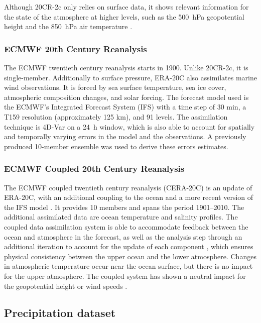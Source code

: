 \documentclass[smallextended]{svjour3}       %
\begin{document}
	Although 20CR-2c only relies on surface data, it shows relevant information for the state of the atmosphere at higher levels, such as the 500~hPa geopotential height and the 850~hPa air temperature \citep{Compo2011}.
	
	
	\subsubsection{ECMWF 20th Century Reanalysis}
	
	The ECMWF twentieth century reanalysis \citep[ERA-20C --][]{Poli2016} starts in 1900. Unlike 20CR-2c, it is single-member. Additionally to surface pressure, ERA-20C also assimilates marine wind observations. It is forced by sea surface temperature, sea ice cover, atmospheric composition changes, and solar forcing. The forecast model used is the ECMWF’s Integrated Forecast System (IFS) with a time step of 30 min, a T159 resolution (approximately 125 km), and 91 levels. The assimilation technique is 4D-Var on a 24~h window, which is also able to account for spatially and temporally varying errors in the model and the observations. A previously produced 10-member ensemble was used to derive these errors estimates.
	
	
	\subsubsection{ECMWF Coupled 20th Century Reanalysis}
	
	The ECMWF coupled twentieth century reanalysis (CERA-20C) is an update of ERA-20C, with an additional coupling to the ocean and a more recent version of the IFS model \citep{Laloyaux2017}. It provides 10 members and spans the period 1901--2010. The additional assimilated data are ocean temperature and salinity profiles. The coupled data assimilation system is able to accommodate feedback between the ocean and atmosphere in the forecast, as well as the analysis step through an additional iteration to account for the update of each component \citep{Laloyaux2016}, which ensures physical consistency between the upper ocean and the lower atmosphere. Changes in atmospheric temperature occur near the ocean surface, but there is no impact for the upper atmosphere. The coupled system has shown a neutral impact for the geopotential height or wind speeds \citep{Laloyaux2016}.
	
	
	
	\subsection{Precipitation dataset}
	\label{sec:precip}
	
\end{document}
